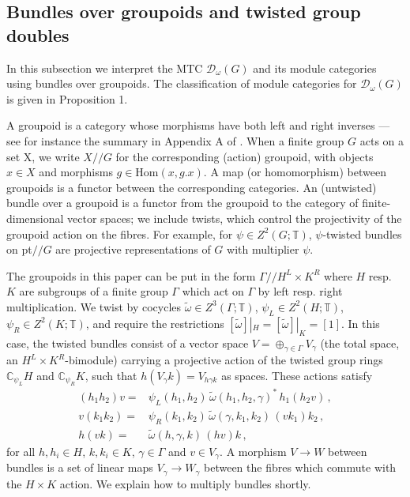 \documentclass[12pt]{article}
\numberwithin{equation}{section}
\def\cD            {{\mathcal{D}}}
\def\bbC           {\mathbb{C}}
\def\bbT           {\mathbb{T}}
\begin{document}
\subsection{Bundles over groupoids and twisted group doubles}

In this subsection we interpret the MTC $\cD_\omega(G)$
and its module categories using bundles over groupoids. The  classification  of module categories for $\cD_\omega(G)$ is given in Proposition 1.

A groupoid is a category whose morphisms  have both left and right inverses --- see for instance the summary in Appendix A of \cite{FHTi}. When a finite group $G$ acts on a set X, we write $X/\!/G$ for the corresponding (action) groupoid, with objects $x\in X$ and morphisms $g\in \mathrm{Hom}(x,g.x)$. A map (or homomorphism) between groupoids is a functor between the corresponding categories. An (untwisted) bundle over a groupoid is  a functor from the groupoid to the category of finite-dimensional vector spaces; we include twists, which control the projectivity of the groupoid action on the fibres. For example,  for $\psi\in Z^2(G;\bbT)$, $\psi$-twisted bundles on pt$/\!/G$ 
are projective representations of $G$ with multiplier $\psi$. 

The groupoids in this {paper} can be put in the form  $\Gamma/\!/H^L\times K^R$ where $H$ resp.{} $K$ are subgroups of a finite group $\Gamma$ which act on $\Gamma$ by left resp.{} right multiplication.
We twist by  cocycles $\widetilde{\omega}\in Z^3(\Gamma;\bbT)$, $\psi_L\in Z^2
(H;\bbT)$, $\psi_R\in Z^2(K;\bbT)$, and require the restrictions $[\widetilde{\omega}]|_H=[\widetilde{\omega}]|_K=[1]$. In this case, the twisted bundles consist of a vector space $V=\oplus_{\gamma\in\Gamma}V_\gamma$ (the total space, an $H^L\times K^R$-bimodule) carrying a projective
action of the twisted group rings $\bbC_{\psi_L}H$ and $\bbC_{\psi_R}K$, such that  $h(V_\gamma k)=V_{h\gamma k}$ as spaces.  These actions satisfy \cite{Ev} 
\begin{eqnarray}(h_1h_2)v=&\psi_L(h_1,h_2)\,{\widetilde{\omega}(h_1,h_2,{\gamma})^*}\,h_1(h_2v)\,,\label{actionleft}\\ v(k_1k_2)=&\psi_R(k_1,k_2)\,{\widetilde{\omega}({\gamma},k_1,k_2)}\,(vk_1)k_2\,,\\
h(vk)=&\widetilde{\omega}(h,{\gamma},k)\,(hv)k\,,\label{actionmixed}\end{eqnarray}
for all $h,h_i\in H$, $k,k_i\in K$, $\gamma\in\Gamma$ and $v\in V_{\gamma}$. 
A morphism  $V\rightarrow W$ between bundles is  a set of linear maps $V_\gamma\rightarrow
W_\gamma$ between the fibres which commute with the $H\times K$ action. We explain how to multiply bundles shortly.
\end{document}
